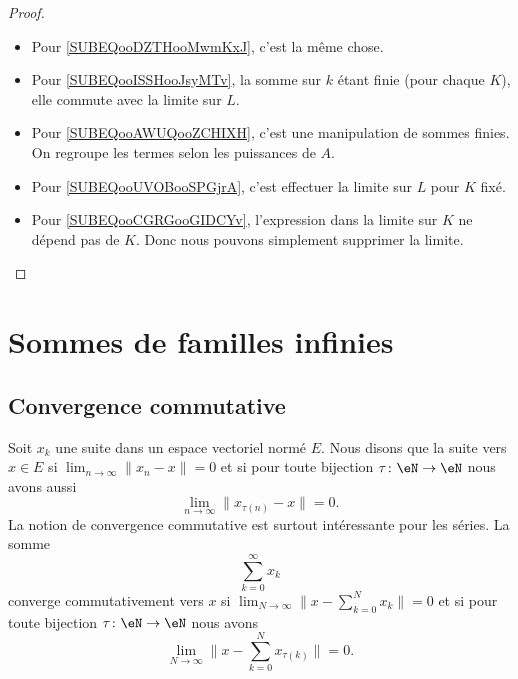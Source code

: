 \begin{proof}
\begin{itemize}
		\item
		      Pour \eqref{SUBEQooDZTHooMwmKxJ}, c'est la même chose.
		\item
		      Pour \eqref{SUBEQooISSHooJsyMTv}, la somme sur \( k\) étant finie (pour chaque \( K\)), elle commute avec la limite sur \( L\).
		\item
		      Pour \eqref{SUBEQooAWUQooZCHIXH}, c'est une manipulation de sommes finies. On regroupe les termes selon les puissances de \( A\).
		\item
		      Pour \eqref{SUBEQooUVOBooSPGjrA}, c'est effectuer la limite sur \( L\) pour \( K\) fixé.
		\item
		      Pour \eqref{SUBEQooCGRGooGIDCYv}, l'expression dans la limite sur \( K\) ne dépend pas de \( K\). Donc nous pouvons simplement supprimer la limite.
	\end{itemize}
\end{proof}


\section{Sommes de familles infinies}
\label{SECooHHDXooUgLhHR}

\subsection{Convergence commutative}

\begin{definition}      \label{DEFooORAGooZslkyS}
	Soit \( x_k\) une suite dans un espace vectoriel normé \( E\). Nous disons que la suite  vers \( x\in E\) si \( \lim_{n\to \infty}\| x_n-x \| =0\) et si pour toute bijection \( \tau\colon \eN\to \eN\) nous avons aussi
	\begin{equation}
		\lim_{n\to \infty} \| x_{\tau(n)}-x \|=0.
	\end{equation}
	La notion de convergence commutative est surtout intéressante pour les séries. La somme
	\begin{equation}
		\sum_{k=0}^{\infty}x_k
	\end{equation}
	converge commutativement vers \( x\) si \( \lim_{N\to \infty} \| x-\sum_{k=0}^Nx_k \|=0\) et si pour toute bijection \( \tau\colon \eN\to \eN\) nous avons
	\begin{equation}
		\lim_{N\to \infty} \| x-\sum_{k=0}^Nx_{\tau(k)} \|=0.
	\end{equation}
\end{definition}

